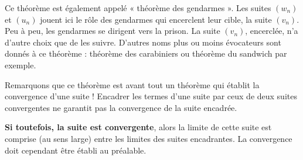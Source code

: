 \documentclass[11pt,fleqn, openany]{book} %
\begin{document}
\begin{center}
\end{center}

Ce théorème est également appelé « théorème des gendarmes ». Les suites $(w_n)$ et $(u_n)$ jouent ici le rôle des gendarmes qui encerclent leur cible, la suite $(v_n)$. Peu à peu, les gendarmes se dirigent vers la prison. La suite $(v_n)$, encerclée, n'a d'autre choix que de les suivre. D'autres noms plus ou moins évocateurs sont donnés à ce théorème : théorème des carabiniers ou théorème du sandwich par exemple.

Remarquons que ce théorème est avant tout un théorème qui établit la convergence d'une suite ! Encadrer les termes d'une suite par ceux de deux suites convergentes ne garantit pas la convergence de la suite encadrée. 

\textbf{Si toutefois, la suite est convergente}, alors la limite de cette suite est comprise (au sens large) entre les limites des suites encadrantes. La convergence doit cependant être établi au préalable.
\end{document}
